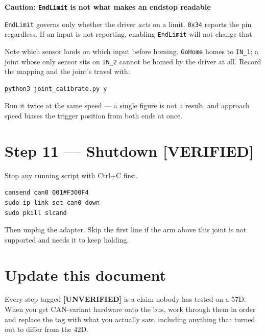 \documentclass[11pt,letterpaper]{article}
\newenvironment{caution}[1]{%
    \par\addvspace{8pt}%
    \noindent{\color{cautionred}\rule{\linewidth}{0.8pt}}\par\vspace{2pt}
    \noindent\textbf{\color{cautionred}Caution: #1}\par\vspace{2pt}
}{%
    \par\vspace{2pt}\noindent{\color{cautionred}\rule{\linewidth}{0.4pt}}%
    \par\addvspace{8pt}%
}
\newcommand{\verified}{{\color{okgreen}\textbf{[VERIFIED]}}}
\newcommand{\unverified}{{\color{unverifiedorange}\textbf{[UNVERIFIED]}}}
\begin{document}
\begin{caution}{\texttt{EndLimit} is not what makes an endstop readable}
\texttt{EndLimit} governs only whether the driver \emph{acts} on a limit.
\texttt{0x34} reports the pin regardless. If an input is not reporting, enabling
\texttt{EndLimit} will not change that.
\end{caution}

Note which sensor lands on which input before homing. \texttt{GoHome} homes to
\texttt{IN\_1}; a joint whose only sensor sits on \texttt{IN\_2} cannot be homed
by the driver at all. Record the mapping and the joint's travel with:

\begin{lstlisting}
python3 joint_calibrate.py y
\end{lstlisting}

Run it twice at the same speed --- a single figure is not a result, and approach
speed biases the trigger position from both ends at once.

\section*{Step 11 --- Shutdown \verified}

Stop any running script with Ctrl+C first.

\begin{lstlisting}
cansend can0 001#F300F4
sudo ip link set can0 down
sudo pkill slcand
\end{lstlisting}

Then unplug the adapter. Skip the first line if the arm above this joint is not
supported and needs it to keep holding.

\section*{Update this document}

Every step tagged \unverified{} is a claim nobody has tested on a 57D. When you get
CAN-variant hardware onto the bus, work through them in order and replace the tag
with what you actually saw, including anything that turned out to differ from the
42D.
\end{document}
